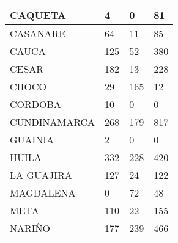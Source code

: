 \documentclass[12pt,a4paper]{article}
\begin{document}
\begin{table}[]
\begin{tabular}{|llll|}
        \multicolumn{1}{|l|}{CAQUETA}                  & \multicolumn{1}{l|}{4}                 & \multicolumn{1}{l|}{0}               & 81            \\ \hline
        \multicolumn{1}{|l|}{CASANARE}                 & \multicolumn{1}{l|}{64}                & \multicolumn{1}{l|}{11}              & 85            \\ \hline
        \multicolumn{1}{|l|}{CAUCA}                    & \multicolumn{1}{l|}{125}               & \multicolumn{1}{l|}{52}              & 380           \\ \hline
        \multicolumn{1}{|l|}{CESAR}                    & \multicolumn{1}{l|}{182}               & \multicolumn{1}{l|}{13}              & 228           \\ \hline
        \multicolumn{1}{|l|}{CHOCO}                    & \multicolumn{1}{l|}{29}                & \multicolumn{1}{l|}{165}             & 12            \\ \hline
        \multicolumn{1}{|l|}{CORDOBA}                  & \multicolumn{1}{l|}{10}                & \multicolumn{1}{l|}{0}               & 0             \\ \hline
        \multicolumn{1}{|l|}{CUNDINAMARCA}             & \multicolumn{1}{l|}{268}               & \multicolumn{1}{l|}{179}             & 817           \\ \hline
        \multicolumn{1}{|l|}{GUAINIA}                  & \multicolumn{1}{l|}{2}                 & \multicolumn{1}{l|}{0}               & 0             \\ \hline
        \multicolumn{1}{|l|}{HUILA}                    & \multicolumn{1}{l|}{332}               & \multicolumn{1}{l|}{228}             & 420           \\ \hline
        \multicolumn{1}{|l|}{LA GUAJIRA}               & \multicolumn{1}{l|}{127}               & \multicolumn{1}{l|}{24}              & 122           \\ \hline
        \multicolumn{1}{|l|}{MAGDALENA}                & \multicolumn{1}{l|}{0}                 & \multicolumn{1}{l|}{72}              & 48            \\ \hline
        \multicolumn{1}{|l|}{META}                     & \multicolumn{1}{l|}{110}               & \multicolumn{1}{l|}{22}              & 155           \\ \hline
        \multicolumn{1}{|l|}{NARIÑO}                   & \multicolumn{1}{l|}{177}               & \multicolumn{1}{l|}{239}             & 466           \\ \hline

\end{tabular}
\end{table}
\end{document}
